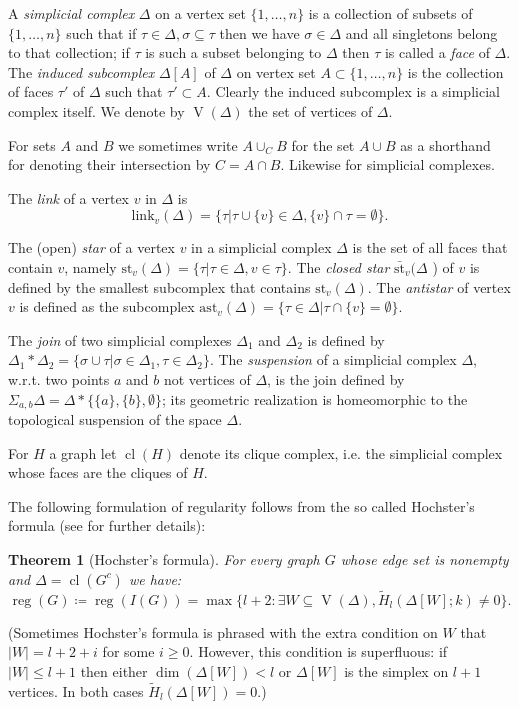 \documentclass[10pt]{article}
\newtheorem{theorem}{Theorem}[section]
\theoremstyle{definition}
\numberwithin{equation}{section}
\newcommand \reg{\operatorname{reg}}
\newcommand \Vr{\operatorname{V}}
\newcommand \cl{\operatorname{cl}}
\newcommand \St{\text{st}}
\begin{document}
  A \emph{simplicial complex} $\Delta$ on a vertex set $\{1,\ldots, n\}$ is a collection of subsets of $\{1,\ldots ,n\}$ such that if $\tau \in \Delta, \sigma \subseteq \tau$ then we have $\sigma \in \Delta$ and all singletons belong to that collection; if $\tau$ is such a subset belonging to $\Delta$ then $\tau$ is called a \emph{face} of $\Delta$. 
 The \emph{induced subcomplex} $\Delta [A]$ of $\Delta$ on vertex set $A\subset \{1,\ldots,n\}$ is the collection of faces $\tau'$ of $\Delta$ such that $\tau' \subset A$. 
 Clearly the induced subcomplex is a simplicial complex itself. We denote by $\Vr(\Delta)$ the set of vertices of $\Delta$.

 For sets  $A$ and $B$ we sometimes write $A\cup_C B$ for the set $A\cup B$ as a shorthand for denoting their intersection by $C=A\cap B$. 
 Likewise for simplicial complexes.

 The \emph{link} of a vertex $v$ in $ \Delta$ is $$\text{link}_v (\Delta)= \{ \tau |\tau \cup \{v\} \in \Delta, \{v\} \cap \tau =\emptyset\}.$$

 The (open) \emph{star} of a vertex $v$ in a simplicial complex $\Delta$ is the set of all faces that contain $v$, namely $\St_v(\Delta)=\{\tau| \tau \in \Delta, v \in \tau\}$. The \emph{closed star} $\bar{\St}_v (\Delta$ ) of $v$ is defined by the smallest subcomplex that contains $\St_v(\Delta)$. The \emph{antistar} of vertex $v$ is defined as the subcomplex $\text{ast}_v (\Delta) = \{\tau \in \Delta| \tau \cap \{v\} = \emptyset\}$.


 The \emph{join} of two simplicial complexes $\Delta_1$ and $\Delta_2$ is defined by $\Delta_1 * \Delta_2=\{\sigma \cup \tau| \sigma \in \Delta_1, \tau \in \Delta_2\}$. 
 The \emph{suspension} of a simplicial complex $\Delta$, w.r.t. two points $a$ and $b$ not vertices of $\Delta$, is the join defined by $\Sigma_{a,b} \Delta=\Delta * \{\{a\},\{b\},\emptyset \}$; its geometric realization is homeomorphic to the topological suspension of the space $\Delta$.

  For $H$ a graph
  let $\cl(H)$ denote its clique complex, i.e. the simplicial complex whose faces are the cliques of $H$.

The following formulation of regularity follows from the so called Hochster's formula
(see {\cite{ms2005}} for further details):

\begin{theorem}[Hochster's formula]
For every graph $G$ whose edge set is nonempty and $\Delta=\cl(G^c)$ we have:
$$\reg(G)\coloneqq\reg(I(G))= \max\{l+2:\exists W \subseteq \Vr(\Delta), \widetilde{H}_l(\Delta[W];k)\neq 0\}.$$
\end{theorem}
(Sometimes Hochster's formula is phrased with the extra condition on $W$ that $|W|=l+2+i$ for some $i\ge 0$. However, this condition is superfluous: if $|W|\le l+1$ then either $\dim(\Delta[W])<l$ or $\Delta[W]$ is the simplex on $l+1$ vertices. In both cases  $\widetilde{H}_l(\Delta[W])=0$.)
\end{document}

